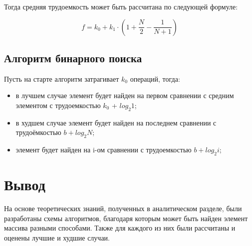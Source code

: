 Тогда средняя трудоемкость может быть рассчитана по следующей формуле:

\begin{equation}
	f = k_0 + k_1 \cdot \left(1 + \frac{N}{2} - \frac{1}{N + 1}\right)
\end{equation}

\subsection{Алгоритм бинарного поиска}

Пусть на старте алгоритм затрагивает $k_0$ операций, тогда: 

\begin{itemize}
	\item в лучшем случае элемент будет найден на первом сравнении с средним элементом с трудоемкостью $k_0$ + $log_2 1$;
	\item в худшем случае элемент будет найден на последнем сравнении с трудоёмкостью $b + log_2 N$;
	\item элемент будет найден на i-ом сравнении с трудоемкостью $b + log_2 i$;
\end{itemize}

\section*{Вывод}

На основе теоретических знаний, полученных в аналитическом разделе, были разработаны схемы алгоритмов, благодаря которым может быть найден элемент массива разными способами. 
Также для каждого из них были рассчитаны и оценены лучшие и худшие случаи.
